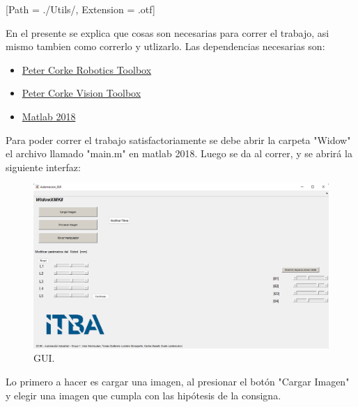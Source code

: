 



\def\verObs{0}


\setmainfont{AvenirLTStd-Roman}[Path = ./Utils/, Extension = .otf]



\setmainfont{Calibri}



En el presente se explica que cosas son necesarias para correr el trabajo, asi mismo tambien como correrlo y utlizarlo.
Las dependencias necesarias son:
\begin{itemize}
\item \href{https://petercorke.com/toolboxes/robotics-toolbox/}{Peter Corke Robotics Toolbox}
\item \href{https://petercorke.com/toolboxes/machine-vision-toolbox/}{Peter Corke Vision Toolbox}
\item \href{https://la.mathworks.com/products/matlab.html}{Matlab 2018}
\end{itemize}
Para poder correr el trabajo satisfactoriamente se debe abrir la carpeta "Widow" el archivo llamado "main.m" en matlab 2018.
Luego se da al correr, y se abrirá la siguiente interfaz:
\begin{figure}[H]
	\centering
	\includegraphics[width=\linewidth]{GUI}
	\caption{GUI.}	
	\label{fig:GUI}
\end{figure}
Lo primero a hacer es cargar una imagen, al presionar el botón "Cargar Imagen" y elegir una imagen que cumpla con las hipótesis de la consigna.
